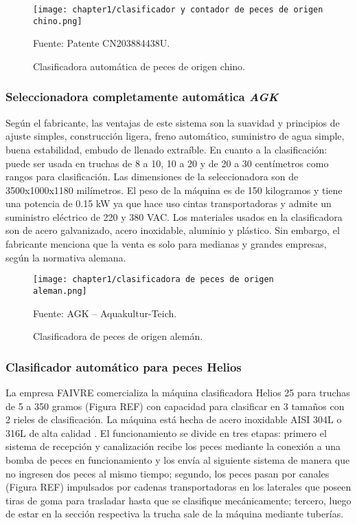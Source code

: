 \begin{figure}[H]
	\centering
	\texttt{[image: chapter1/clasificador y contador de peces de origen chino.png]}
	\caption{Clasificadora automática de peces de origen chino.}
	Fuente: Patente CN203884438U.
	\label{fig:clasificador y contador de peces de origen chino}
\end{figure}

\subsubsection{Seleccionadora completamente automática \textit{AGK}}

Según el fabricante, las ventajas de este sistema son la suavidad y principios de ajuste simples, construcción ligera, freno automático, suministro de agua simple, buena estabilidad, embudo de llenado extraíble. En cuanto a la clasificación: puede ser usada en truchas de 8 a 10, 10 a 20 y de 20 a 30 centímetros como rangos para clasificación. Las dimensiones de la seleccionadora son de 3500x1000x1180 milímetros. El peso de la máquina es de 150 kilogramos y tiene una potencia de 0.15 kW ya que hace uso cintas transportadoras y admite un suministro eléctrico de 220 y 380 VAC. Los materiales usados en la clasificadora son de acero galvanizado, acero inoxidable, aluminio y plástico.\cite{AGKAquakultur-Teich2010} Sin embargo, el fabricante menciona que la venta es solo para medianas y grandes empresas, según la normativa alemana.

\begin{figure}[H]
	\centering
	\texttt{[image: chapter1/clasificadora de peces de origen aleman.png]}
	\caption{Clasificadora de peces de origen alemán.}
	Fuente: AGK – Aquakultur-Teich.
	\label{fig:clasificadora de peces de origen aleman}
\end{figure}

\subsubsection{Clasificador automático para peces Helios}

La empresa FAIVRE comercializa la máquina clasificadora Helios 25 para truchas de 5 a 350 gramos (Figura REF) con capacidad para clasificar en 3 tamaños con 2 rieles de clasificación. La máquina está hecha de acero inoxidable AISI 304L o 316L de alta calidad \cite{FAIVRE2019a}. El funcionamiento se divide en tres etapas: primero el sistema de recepción y canalización recibe los peces mediante la conexión a una bomba de peces en funcionamiento y los envía al siguiente sistema de manera que no ingresen dos peces al mismo tiempo; segundo, los peces pasan por canales (Figura REF) impulsados por cadenas transportadoras en los laterales que poseen tiras de goma para trasladar hasta que se clasifique mecánicamente; tercero, luego de estar en la sección respectiva la trucha sale de la máquina mediante tuberías.

